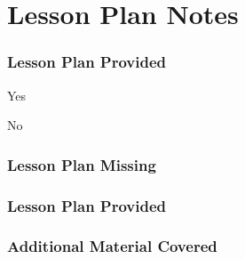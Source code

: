 \documentclass[10pt]{article}
\begin{document}
\section*{Lesson Plan Notes}
\begin{framed}

\subsubsection*{Lesson Plan Provided}

\begin{todolist}
    \item Yes
    \item No
\end{todolist}

\subsubsection*{Lesson Plan Missing}
\begin{description}
    \item[\small{Material Presented}] \uline{\hfill\null}
    \item \uline{\hfill\null}
    \item \uline{\hfill\null}
\end{description}


\subsubsection*{Lesson Plan Provided}
\begin{description}
    \item \uline{\hfill\null}
    \item \uline{\hfill\null}
    \item \uline{\hfill\null}
\end{description}


\subsubsection*{Additional Material Covered}
\begin{description}
    \item \uline{\hfill\null}
    \item \uline{\hfill\null}
\end{description}

\vspace{0.25in}


\end{framed}
\end{document}
